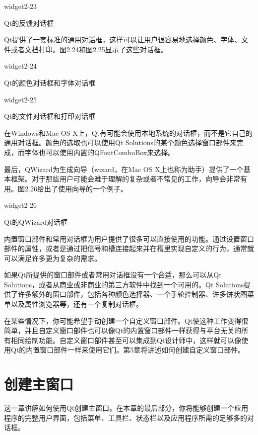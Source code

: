 \documentclass[11pt,oneside]{book}
\begin{document}
\begin{common-format}
\begin{linefig}[0.8]{widget2-23}
\caption{Qt的反馈对话框}
\label{fig:widget2-23}
\end{linefig}

Qt提供了一套标准的通用对话框，这样可以让用户很容易地选择颜色、字体、文件或者文档打印。图2.24和图2.25显示了这些对话框。
\begin{linefig}[0.8]{widget2-24}
\caption{Qt的颜色对话框和字体对话框}
\label{fig:widget2-24}
\end{linefig}

\begin{linefig}[0.8]{widget2-25}
\caption{Qt的文件对话框和打印对话框}
\label{fig:widget2-25}
\end{linefig}

在Windows和Mac OS X上，Qt有可能会使用本地系统的对话框，而不是它自己的通用对话框。颜色的选取也可以使用Qt Solutions的某个颜色选择窗口部件来完成，而字体也可以使用内置的QFontComboBox来选择。

最后，QWizard为生成向导（wizard，在Mac OS X上也称为助手）提供了一个基本框架。对于那些用户可能会难于理解的复杂或者不常见的工作，向导会非常有用。图2.26给出了使用向导的一个例子。

\begin{linefig}[0.8]{widget2-26}
\caption{Qt的QWizard对话框}
\label{fig:widget2-26}
\end{linefig}

内置窗口部件和常用对话框为用户提供了很多可以直接使用的功能。通过设置窗口部件的属性，或者是通过把信号和槽连接起来并在槽里实现自定义的行为，通常就可以满足许多更为复杂的需求。

如果Qt所提供的窗口部件或者常用对话框没有一个合适，那么可以从Qt Solutions，或者从商业或非商业的第三方软件中找到一个可用的。Qt Solutions提供了许多额外的窗口部件，包括各种颜色选择器、一个手轮控制器、许多饼状图菜单以及属性浏览器等，还有一个复制对话框。

在某些情况下，你可能希望手动创建一个自定义窗口部件。Qt使这种工作变得很简单，并且自定义窗口部件也可以像Qt的内置窗口部件一样获得与平台无关的所有相同绘制功能。自定义窗口部件甚至可以集成到Qt设计师中，这样就可以像使用Qt的内置窗口部件一样来使用它们。第5章将讲述如何创建自定义窗口部件。


\chapter{创建主窗口}
这一章讲解如何使用Qt创建主窗口。在本章的最后部分，你将能够创建一个应用程序的完整用户界面，包括菜单、工具栏、状态栏以及应用程序所需的足够多的对话框。


\end{common-format}
\end{document}
